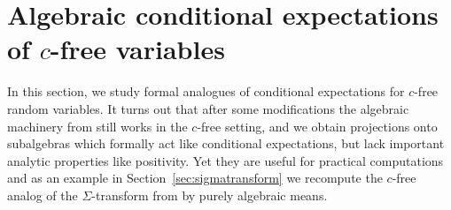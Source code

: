 \documentclass[12pt]{amsart}
\def\E{E}
\newcommand{\alg}[1]{\mathcal{#1}}
\theoremstyle{definition}
\numberwithin{equation}{section}
\begin{document}
\section{Algebraic conditional expectations of $c$-free variables}\label{sec:6}

In this section, we study formal analogues of conditional expectations for
$c$-free random variables.
It turns out that after some modifications the algebraic machinery from
\cite{LehnerSzpojankowski:2023:freeint1} still works in the $c$-free setting,
and we obtain projections onto subalgebras which formally
act like conditional expectations,
but lack important analytic properties like positivity.
Yet they are useful for practical computations and as an example
in Section~\ref{sec:sigmatransform} we recompute the
$c$-free analog of the $\Sigma$-transform  from \cite{PopaWang:2011:multiplicative}
by purely algebraic means.




		


\end{document}
